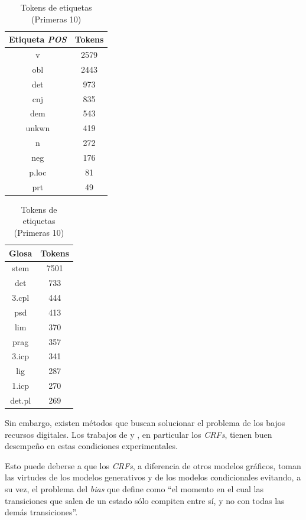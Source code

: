 \documentclass[letterpaper,12pt,oneside]{book}
\theoremstyle{definition}
\begin{document}
\begin{table}[h]
	\centering
	\begin{tabular}{|c | c|}\hline
		\textbf{Etiqueta \textit{POS}} & \textbf{Tokens} \\ \hline
		v & 2579 \\
        obl & 2443 \\
        det & 973 \\
        cnj & 835 \\
        dem & 543 \\
        unkwn & 419 \\
        n & 272 \\
        neg & 176 \\
        p.loc & 81 \\
        prt & 49 \\\hline
	\end{tabular}
	\quad
	\begin{tabular}{|c | c|}\hline                            
		\textbf{Glosa} & \textbf{Tokens} \\ \hline
		stem & 7501 \\
        det & 733 \\
        3.cpl & 444 \\
        psd & 413 \\
        lim & 370 \\
        prag & 357 \\
        3.icp & 341 \\
        lig & 287 \\
        1.icp & 270 \\
        det.pl & 269 \\\hline
	\end{tabular}
	\caption{Tokens de etiquetas (Primeras 10)}
	\label{table_pos_gloss_tokens}
\end{table}

Sin embargo, existen métodos que buscan solucionar el problema de los bajos recursos digitales. Los trabajos de \citet{moeller2018automatic} y \citet{anastasopoulos2018partofspeech}, en particular los \textit{CRFs}, tienen buen desempeño en estas condiciones experimentales.

Esto puede deberse a que los \textit{CRFs}, a diferencia de otros modelos gráficos, toman las virtudes de los modelos generativos y de los modelos condicionales evitando, a su vez, el problema del \textit{bias} que \citet{lafferty2001conditional} define como ``el momento en el cual las transiciones que salen de un estado sólo compiten entre sí, y no con todas las demás transiciones''.
\end{document}
